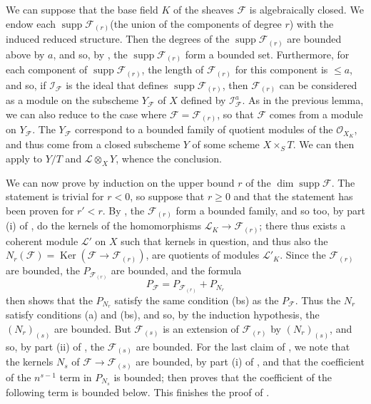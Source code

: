   \begin{cproof}
      We can suppose that the base field $K$ of the sheaves $\mathcal{F}$ is algebraically closed.
      We endow each $\operatorname{supp}\mathcal{F}_{(r)}$(the union of the components of degree $r$) with the induced reduced structure.
      Then the degrees of the $\operatorname{supp}\mathcal{F}_{(r)}$ are bounded above by $a$, and so, by , the $\operatorname{supp}\mathcal{F}_{(r)}$ form a bounded set.
      Furthermore, for each component of $\operatorname{supp}\mathcal{F}_{(r)}$, the length of $\mathcal{F}_{(r)}$ for this component is $\leqslant a$, and so, if $\mathcal{I}_\mathcal{F}$ is the ideal that defines $\operatorname{supp}\mathcal{F}_{(r)}$, then $\mathcal{F}_{(r)}$ can be considered as a module on the subscheme $Y_\mathcal{F}$ of $X$ defined by $\mathcal{I}_\mathcal{F}^a$.
      As in the previous lemma, we can also reduce to the case where $\mathcal{F}=\mathcal{F}_{(r)}$, so that $\mathcal{F}$ comes from a module on $Y_\mathcal{F}$.
      The $Y_\mathcal{F}$ correspond to a bounded family of quotient modules of the $\mathcal{O}_{X_K}$, and thus come from a closed subscheme $Y$ of some scheme $X\times_S T$.
      We can then apply  to $Y/T$ and $\mathcal{L}\otimes_X Y$, whence the conclusion.
  \end{cproof}


  We can now prove  by induction on the upper bound $r$ of the $\dim\operatorname{supp}\mathcal{F}$.
  The statement is trivial for $r<0$, so suppose that $r\geqslant0$ and that the statement has been proven for $r'<r$.
  By , the $\mathcal{F}_{(r)}$ form a bounded family, and so too, by part (i) of , do the kernels of the homomorphisms $\mathcal{L}_K\to\mathcal{F}_{(r)}$;
  there thus exists a coherent module $\mathcal{L}'$ on $X$ such that kernels in question, and thus also the $N_r(\mathcal{F})=\operatorname{Ker}(\mathcal{F}\to\mathcal{F}_{(r)})$, are quotients of modules $\mathcal{L}'_K$.
  Since the $\mathcal{F}_{(r)}$ are bounded, the $P_{\mathcal{F}_{(r)}}$ are bounded, and the formula
  \[
    P_\mathcal{F}
    = P_{\mathcal{F}_{(r)}} + P_{N_r}
  \]
  then shows that the $P_{N_r}$ satisfy the same condition (bs) as the $P_\mathcal{F}$.
  Thus the $N_r$ satisfy conditions (a) and (bs), and so, by the induction hypothesis, the $(N_r)_{(s)}$ are bounded.
  But $\mathcal{F}_{(s)}$ is an extension of $\mathcal{F}_{(r)}$ by $(N_r)_{(s)}$, and so, by part (ii) of , the $\mathcal{F}_{(s)}$ are bounded.
  For the last claim of , we note that the kernels $N_s$ of $\mathcal{F}\to\mathcal{F}_{(s)}$ are bounded, by part (i) of , and that the coefficient of the $n^{s-1}$ term in $P_{N_s}$ is bounded;
  then  proves that the coefficient of the following term is bounded below.
  This finishes the proof of .
